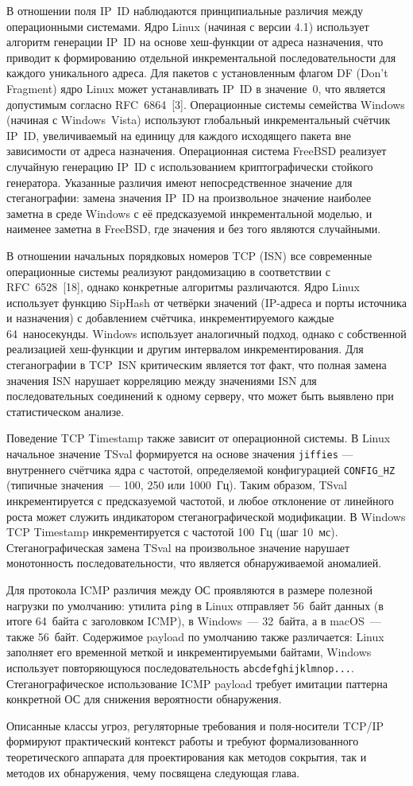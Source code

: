 В отношении поля IP~ID наблюдаются принципиальные различия между операционными системами. Ядро Linux (начиная с версии 4.1) использует алгоритм генерации IP~ID на основе хеш-функции от адреса назначения, что приводит к формированию отдельной инкрементальной последовательности для каждого уникального адреса. Для пакетов с установленным флагом DF (Don't Fragment) ядро Linux может устанавливать IP~ID в значение~0, что является допустимым согласно RFC~6864~[3]. Операционные системы семейства Windows (начиная с Windows~Vista) используют глобальный инкрементальный счётчик IP~ID, увеличиваемый на единицу для каждого исходящего пакета вне зависимости от адреса назначения. Операционная система FreeBSD реализует случайную генерацию IP~ID с использованием криптографически стойкого генератора. Указанные различия имеют непосредственное значение для стеганографии: замена значения IP~ID на произвольное значение наиболее заметна в среде Windows с её предсказуемой инкрементальной моделью, и наименее заметна в FreeBSD, где значения и без того являются случайными.

В отношении начальных порядковых номеров TCP (ISN) все современные операционные системы реализуют рандомизацию в соответствии с RFC~6528~[18], однако конкретные алгоритмы различаются. Ядро Linux использует функцию SipHash от четвёрки значений (IP-адреса и порты источника и назначения) с добавлением счётчика, инкрементируемого каждые 64~наносекунды. Windows использует аналогичный подход, однако с собственной реализацией хеш-функции и другим интервалом инкрементирования. Для стеганографии в TCP~ISN критическим является тот факт, что полная замена значения ISN нарушает корреляцию между значениями ISN для последовательных соединений к одному серверу, что может быть выявлено при статистическом анализе.

Поведение TCP Timestamp также зависит от операционной системы. В Linux начальное значение TSval формируется на основе значения \texttt{jiffies} --- внутреннего счётчика ядра с частотой, определяемой конфигурацией \texttt{CONFIG\_HZ} (типичные значения~--- 100, 250 или 1000~Гц). Таким образом, TSval инкрементируется с предсказуемой частотой, и любое отклонение от линейного роста может служить индикатором стеганографической модификации. В Windows TCP Timestamp инкрементируется с частотой 100~Гц (шаг 10~мс). Стеганографическая замена TSval на произвольное значение нарушает монотонность последовательности, что является обнаруживаемой аномалией.

Для протокола ICMP различия между ОС проявляются в размере полезной нагрузки по умолчанию: утилита \texttt{ping} в Linux отправляет 56~байт данных (в итоге 64~байта с заголовком ICMP), в Windows~--- 32~байта, а в macOS~--- также 56~байт. Содержимое payload по умолчанию также различается: Linux заполняет его временной меткой и инкрементируемыми байтами, Windows использует повторяющуюся последовательность \texttt{abcdefghijklmnop...}. Стеганографическое использование ICMP payload требует имитации паттерна конкретной ОС для снижения вероятности обнаружения.

Описанные классы угроз, регуляторные требования и поля-носители TCP/IP формируют практический контекст работы и требуют формализованного теоретического аппарата для проектирования как методов сокрытия, так и методов их обнаружения, чему посвящена следующая глава.
